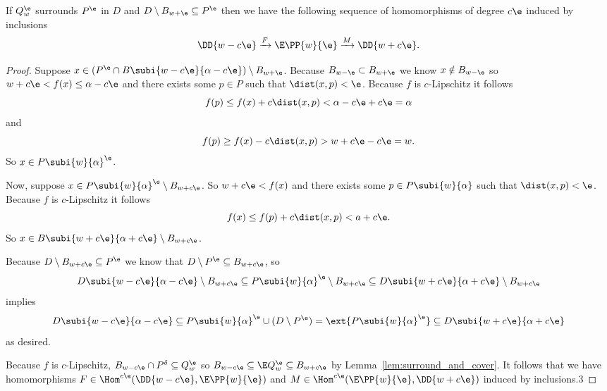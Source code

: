 \begin{lemma}\label{lem:p_interleave}
 If $Q_w^\e$ surrounds $P^\e$ in $D$ and $D\setminus B_{w + \e}\subseteq P^\e$ then we have the following sequence of homomorphisms of degree $c\e$ induced by inclusions
 \[\DD{w-c\e}\xrightarrow{F}\E\PP{w}{\e}\xrightarrow{M}\DD{w+c\e}.\]
\end{lemma}
\begin{proof}
  Suppose $x\in (P^\e\cap B\subi{w-c\e}{\alpha-c\e})\setminus B_{w+\e}$.
  Because $B_{w-\e}\subset B_{w+\e}$ we know $x\notin B_{w-\e}$ so $w+c\e < f(x)\leq \alpha-c\e$ and there exists some $p\in P$ such that $\dist(x, p) < \e$.
  Because $f$ is $c$-Lipschitz it follows
  \[ f(p)\leq f(x) + c\dist(x, p) < \alpha - c\e + c\e = \alpha\]
  and
  \[ f(p)\geq f(x) - c\dist(x, p) > w+c\e-c\e = w.\]
  So $x\in P\subi{w}{\alpha}^\e$.

  Now, suppose $x\in P\subi{w}{\alpha}^\e\setminus B_{w+c\e}$.
  So $w+c\e < f(x)$ and there exists some $p\in P\subi{w}{\alpha}$ such that $\dist(x,p) < \e$.
  Because $f$ is $c$-Lipschitz it follows
  \[ f(x) \leq f(p) + c\dist(x,p) < a + c\e.\]
  So $x\in B\subi{w+c\e}{\alpha+c\e}\setminus B_{w+c\e}$.

  Because $D\setminus B_{w+c\e}\subseteq P^\e$ we know that $D\setminus P^\e \subseteq B_{w+c\e}$, so
  \[D\subi{w-c\e}{\alpha-c\e}\setminus B_{w+c\e} \subseteq P\subi{w}{\alpha}^\e\setminus B_{w+c\e}\subseteq D\subi{w+c\e}{\alpha+c\e}\setminus B_{w+c\e}\]
  implies
  \[ D\subi{w-c\e}{\alpha-c\e}\subseteq P\subi{w}{\alpha}^\e\cup (D\setminus P^\e) = \ext{P\subi{w}{\alpha}^\e} \subseteq D\subi{w+c\e}{\alpha+c\e} \]
  as desired.

  Because $f$ is $c$-Lipschitz, $B_{w-c\e}\cap P^\delta\subseteq Q_{w}^\e$ so $B_{w-c\e} \subseteq \E Q_w^\e\subseteq B_{w+c\e}$ by Lemma~\ref{lem:surround_and_cover}.
  It follows that we have homomorphisms $F\in \Hom^{c\e}(\DD{w-c\e}, \E\PP{w}{\e})$ and $M\in\Hom^{c\e}(\E\PP{w}{\e}, \DD{w+c\e})$ induced by inclusions.3

\end{proof}

